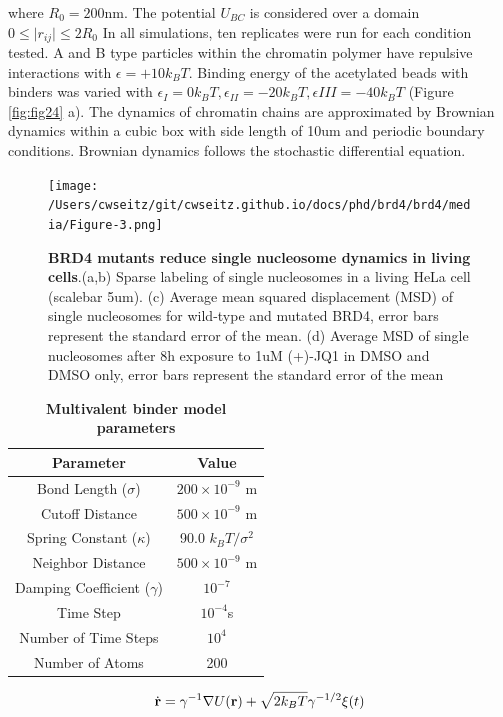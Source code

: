where $R_0=200$nm. The potential $U_{BC}$ is considered over a domain $0\leq\lvert r_{ij}\lvert\leq 2 R_0$ In all simulations, ten replicates were run for each condition tested. A and B type particles within the chromatin polymer have repulsive interactions with $\epsilon = +10k_{B}T$. Binding energy of the acetylated beads with binders was varied with $\epsilon_{I} = 0 k_{B}T,\epsilon_{II} = -20k_{B}T,\epsilon{III}=-40k_{B}T$ (Figure \ref{fig:fig24} a). The dynamics of chromatin chains are approximated by Brownian dynamics within a cubic box with side length of 10um and periodic boundary conditions. Brownian dynamics follows the stochastic differential equation.

\begin{figure}[t]
\texttt{[image: /Users/cwseitz/git/cwseitz.github.io/docs/phd/brd4/brd4/media/Figure-3.png]}
\caption{\textbf{BRD4 mutants reduce single nucleosome dynamics in living cells}.(a,b) Sparse labeling of single nucleosomes in a living HeLa cell (scalebar 5um). (c) Average mean squared displacement (MSD) of single nucleosomes for wild-type and mutated BRD4, error bars represent the standard error of the mean. (d) Average MSD of single nucleosomes after 8h exposure to 1uM (+)-JQ1 in DMSO and DMSO only, error bars represent the standard error of the mean}
\label{fig:fig26}
\end{figure}

\begin{table}[h!]
\centering
\begin{tabular}{|c|c|}
\hline
\textbf{Parameter} & \textbf{Value} \\ \hline
Bond Length ($\sigma$) & $200 \times 10^{-9}$ m \\ \hline
Cutoff Distance & $500 \times 10^{-9}$ m \\ \hline
Spring Constant ($\kappa$) & 90.0 $k_{B}T/\sigma^2$ \\ \hline
Neighbor Distance & $500 \times 10^{-9}$ m \\ \hline
Damping Coefficient ($\gamma$) & $10^{-7}$ \\ \hline
Time Step & $10^{-4}$s\\ \hline
Number of Time Steps & $10^4$ \\ \hline
Number of Atoms & 200 \\ \hline
\end{tabular}
\caption{\textbf{Multivalent binder model parameters}}
\end{table}

\begin{equation*}
\dot{\bold{r}} = \gamma^{-1}\nabla U(\bold{r}) +\sqrt{2 k_{B}T}\gamma^{-1/2}\xi(t)
\end{equation*}

